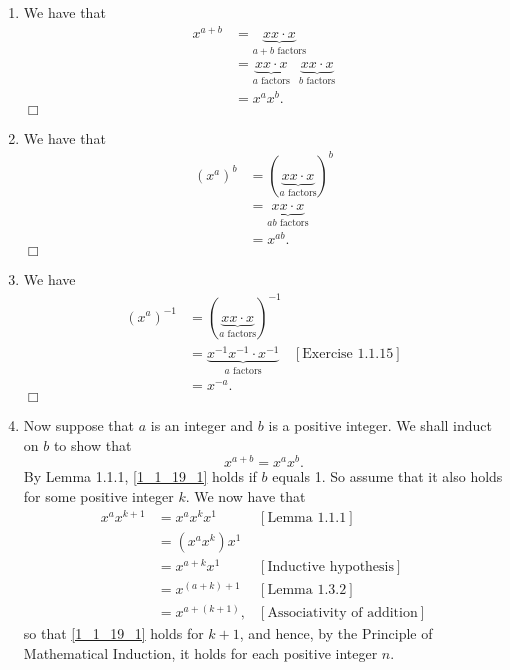 \documentclass[9pt]{article}
\newcommand{\qed}{\hfill \ensuremath{\Box}}
\begin{document}
\begin{enumerate}
      \begin{enumerate}
         \item We have that
               \begin{align*}
                  x^{a+b} &= \underbrace{xx\cdot x}_{a+b \text{ factors}} \\
                          &= \underbrace{xx\cdot x}_{a \text{ factors}}\mbox{ }
                             \underbrace{xx\cdot x}_{b \text{ factors}} \\
                          &= x^ax^b.
               \end{align*} \qed
         \item We have that
               \begin{align*}
                  (x^a)^b &= (\underbrace{xx\cdot x}_{a \text{ factors}})^b \\
                          &= \underbrace{xx\cdot x}_{ab \text{ factors}} \\
                          &= x^{ab}.
               \end{align*} \qed
         \item We have
               \begin{align*}
                  (x^a)^{-1}
                     &= (\underbrace{xx\cdot x}_{a \text{ factors}})^{-1} \\
                     &= \underbrace{x^{-1}x^{-1}\cdot x^{-1}}_{
                           a \text{ factors}} &[\text{Exercise 1.1.15}] \\
                     &= x^{-a}.
               \end{align*} \qed
         \item Now suppose that $a$ is an integer and $b$ is a positive integer.
               We shall induct on $b$ to show that
               \begin{equation}
                  x^{a+b} = x^ax^b. \label{1_1_19_1}
               \end{equation}
               By Lemma 1.1.1, \eqref{1_1_19_1} holds if $b$ equals 1. So assume
               that it also holds for some positive integer $k$. We now have
               that
               \begin{align*}
                  x^ax^{k+1} &= x^ax^kx^1 &[\text{Lemma 1.1.1}] \\
                             &= (x^ax^k)x^1 \\
                             &= x^{a+k}x^1 &[\text{Inductive hypothesis}] \\
                             &= x^{(a+k)+1} &[\text{Lemma 1.3.2}] \\
                             &= x^{a+(k+1)}, &[\text{Associativity of addition}]
               \end{align*}
               so that \eqref{1_1_19_1} holds for $k + 1$, and hence, by the 
               Principle of Mathematical Induction, it holds for each positive
               integer $n$. \\


\end{enumerate}
\end{enumerate}
\end{document}
